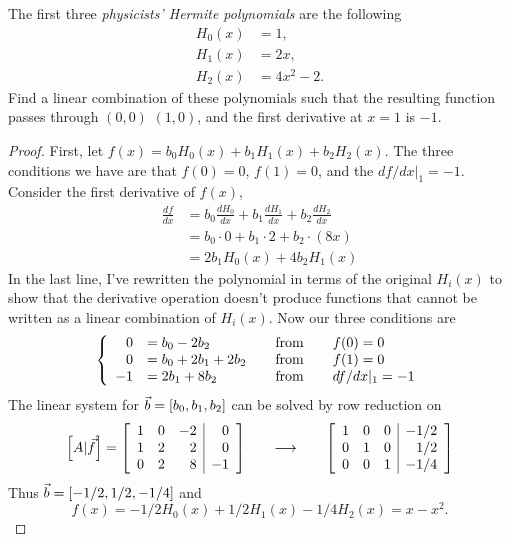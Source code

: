 \documentclass{tutorial}
\begin{document}
\begin{prob}[Fitting] The first three \emph{physicists' Hermite polynomials} are the following
\begin{align*}
  H_0(x) &= 1, \\
  H_1(x) &= 2x, \\
  H_2(x) &= 4x^2-2.
\end{align*}
Find a linear combination of these polynomials such that the resulting function passes through $(0,0)$ $(1,0)$, and the first derivative at $x=1$ is $-1$.
\end{prob} \ifsolns \begin{proof}
First, let $f(x) = b_0H_0(x) + b_1H_1(x) + b_2H_2(x)$. The three conditions we have are that $f(0)=0$, $f(1)=0$, and the $df/dx|_1=-1$. Consider the first derivative of $f(x)$,
\begin{align*}
  \frac{df}{dx} &= b_0 \frac{dH_0}{dx} + b_1 \frac{dH_1}{dx} + b_2 \frac{dH_2}{dx} \\
  &= b_0 \cdot 0 + b_1 \cdot 2 + b_2 \cdot (8x) \\
  & = 2b_1H_0(x) + 4b_2H_1(x)
\end{align*}
In the last line, I've rewritten the polynomial in terms of the original $H_i(x)$ to show that the derivative operation doesn't produce functions that cannot be written as a linear combination of $H_i(x)$. Now our three conditions are
\[
  \left\{ \begin{array}{rlcl}
    0 &= b_0 -2b_2& \hspace{0.15in} \text{from} \hspace{0.15in} & f(0)=0 \\
    0 &= b_0 + 2b_1 + 2b_2 & \hspace{0.15in} \text{from} \hspace{0.15in} & f(1)=0 \\
   -1 &= 2b_1 + 8b_2 & \hspace{0.15in} \text{from} \hspace{0.15in} & df/dx|_1=-1
  \end{array} \right.
\]
The linear system for $\vec{b} = \left[ b_0, b_1, b_2 \right]$ can be solved by row reduction on
\[
  \left[ A| \vec{f} \right]
  = \left[ \begin{array}{rrr|r}
    1 & 0 &-2 & 0 \\
    1 & 2 & 2 & 0 \\
    0 & 2 & 8 &-1 \\
  \end{array} \right]
  \hspace{0.25in} \longrightarrow \hspace{0.25in}
  \left[ \begin{array}{rrr|r}
    1 & 0 & 0 &-1/2 \\
    0 & 1 & 0 & 1/2 \\
    0 & 0 & 1 &-1/4 \\
  \end{array} \right]
\]
Thus $\vec{b} = \left[ -1/2, 1/2, -1/4 \right]$ and 
\[
  \boxed{f(x) = -1/2 H_0(x) + 1/2 H_1(x) - 1/4 H_2(x) = x-x^2 .}
\]
\end{proof}\else \newpage \fi
\end{document}
